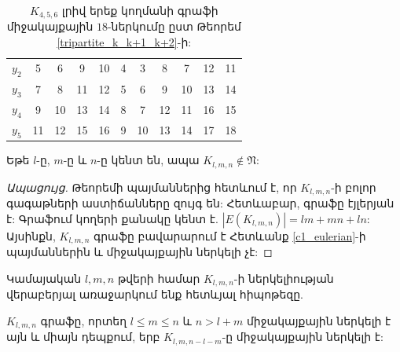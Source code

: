 \begin{table}[]
\begin{tabular}{ccccccccccc}
\multicolumn{1}{c|}{$y_2$} & \multicolumn{1}{c|}{5}  & \multicolumn{1}{c|}{6}  & \multicolumn{1}{c|}{9}  & \multicolumn{1}{c|}{10} & \multicolumn{1}{c|}{4}   & \multicolumn{1}{c|}{3}   & \multicolumn{1}{c|}{8}   & \multicolumn{1}{c|}{7}   & \multicolumn{1}{c|}{12}   & \multicolumn{1}{c|}{11}   \\ \cline{2-11} 
\multicolumn{1}{c|}{$y_3$} & \multicolumn{1}{c|}{7}  & \multicolumn{1}{c|}{8}  & \multicolumn{1}{c|}{11} & \multicolumn{1}{c|}{12} & \multicolumn{1}{c|}{5}   & \multicolumn{1}{c|}{6}   & \multicolumn{1}{c|}{9}   & \multicolumn{1}{c|}{10}  & \multicolumn{1}{c|}{13}   & \multicolumn{1}{c|}{14}   \\ \cline{2-11} 
\multicolumn{1}{c|}{$y_4$} & \multicolumn{1}{c|}{9}  & \multicolumn{1}{c|}{10} & \multicolumn{1}{c|}{13} & \multicolumn{1}{c|}{14} & \multicolumn{1}{c|}{8}   & \multicolumn{1}{c|}{7}   & \multicolumn{1}{c|}{12}  & \multicolumn{1}{c|}{11}  & \multicolumn{1}{c|}{16}   & \multicolumn{1}{c|}{15}   \\ \cline{2-11} 
\multicolumn{1}{c|}{$y_5$} & \multicolumn{1}{c|}{11} & \multicolumn{1}{c|}{12} & \multicolumn{1}{c|}{15} & \multicolumn{1}{c|}{16} & \multicolumn{1}{c|}{9}   & \multicolumn{1}{c|}{10}  & \multicolumn{1}{c|}{13}  & \multicolumn{1}{c|}{14}  & \multicolumn{1}{c|}{17}   & \multicolumn{1}{c|}{18}   \\ \cline{2-11} 
\end{tabular}
\caption{$K_{4,5,6}$ լրիվ երեք կողմանի գրաֆի միջակայքային $18$-ներկումը ըստ Թեորեմ \ref{tripartite_k_k+1_k+2}-ի:}\label{tripartite_4_5_6}

\end{table}

\begin{theorem}
Եթե $l$-ը, $m$-ը և $n$-ը կենտ են, ապա $K_{l,m,n} \notin \mathfrak{N}$:
\end{theorem}
\begin{proof}[Ապացույց]
Թեորեմի պայմաններից հետևում է, որ $K_{l,m,n}$-ի բոլոր գագաթների աստիճանները զույգ են: Հետևաբար, գրաֆը էյլերյան է: Գրաֆում կողերի քանակը կենտ է. $|E(K_{l,m,n})| = lm + mn + ln$: Այսինքն, $K_{l,m,n}$ գրաֆը բավարարում է Հետևանք \ref{c1_eulerian}-ի պայմաններին և միջակայքային ներկելի չէ:
\end{proof}



Կամայական $l, m, n$ թվերի համար $K_{l,m,n}$-ի ներկելիության վերաբերյալ առաջարկում ենք հետևյալ հիպոթեզը.

\begin{hypothesis}
$K_{l,m,n}$ գրաֆը, որտեղ $l \le m \le n$ և $n > l+m$ միջակայքային ներկելի է այն և միայն դեպքում, երբ $K_{l,m,n-l-m}$-ը միջակայքային ներկելի է:
\end{hypothesis}


